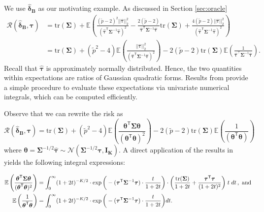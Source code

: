 \documentclass{article}
\newcommand{\bstheta}{\boldsymbol \theta}
\newcommand{\bstau}{\boldsymbol \tau}
\newcommand{\hbstau}{\boldsymbol{\hat \tau}}
\newcommand{\bsSig}{\boldsymbol  \Sigma}
\def\E{\mathbb{E}}
\newcommand{\Tr}{\text{tr}}
\newcommand{\bsdeltb}{\boldsymbol {\hat \delta_B}}
\newcommand{\tran}{\mathsf{T}}
\begin{document}
We use $\bsdeltb$ as our motivating example. As discussed in Section \ref{sec:oracle}
\begin{equation}\label{eq:riskStatement}
\begin{aligned}
\mathcal{R}\left( \bsdeltb, \bstau \right) &= \Tr(\boldsymbol \Sigma) + \E \left( \frac{(\tilde p - 2)^2 ||\hbstau||_2^2}{(\hbstau^\tran \bsSig^{-1} \hbstau)^2}  - 
 \frac{2(\tilde p - 2)}{\hbstau^\tran \bsSig^{-1} \hbstau} \Tr(\bsSig) + \frac{4(\tilde p - 2)|| \hbstau ||_2^2}{(\hbstau^\tran \bsSig^{-1} \hbstau)^2} \right)  \\
&= \Tr(\boldsymbol \Sigma) + (\tilde p^2 - 4) \E \left( \frac{||\hbstau||_2^2}{(\hbstau^\tran \bsSig^{-1} \hbstau)^2} \right) - 2(\tilde p - 2)\Tr(\boldsymbol \Sigma) \E \left( \frac{1 }{\hbstau^\top \bsSig^{-1} \hbstau}  \right)  .
\end{aligned}
\end{equation}
\noindent Recall that $\hbstau$ is approximately normally distributed. Hence, the two quantities within expectations are ratios of Gaussian quadratic forms. Results from \cite{bao2013moments} provide a simple procedure to evaluate these expectations via univariate numerical integrals, which can be computed efficiently. 

Observe that we can rewrite the risk as 
\[ \mathcal{R}\left( \bsdeltb, \bstau \right) = \Tr(\boldsymbol \Sigma) + (\tilde p^2 - 4) \E \left( \frac{\bstheta^\tran \boldsymbol \Sigma \bstheta}{\left( \bstheta^{\tran} \bstheta \right)^2} \right) - 2(\tilde p - 2)\Tr(\bsSig) \E \left( \frac{1 }{\left( \bstheta^{\tran} \bstheta \right)}  \right)  \] 
where $\bstheta = \bsSig^{-1/2} \hbstau \sim \mathcal{N} \left( \bsSig^{-1/2} \bstau, \boldsymbol{I_K} \right)$. %
A direct application of the results in \cite{bao2013moments} yields the following integral expressions: 

\begin{equation}\label{eq:integrals1}
\begin{aligned}
\E\left(  \frac{ \bstheta^{\tran}\bsSig \bstheta}{(\bstheta^{\tran} \bstheta)^2} \right) &= \int_0^{\infty}  ( 1 + 2 t)^{-K/2} \cdot \exp\bigg( - (\bstau^\tran \bsSig^{-1} \bstau) \cdot \frac{t}{1 + 2t} \bigg) \cdot \bigg( \frac{\Tr (\bsSig)}{1 + 2t} + \frac{\bstau^\tran \bstau}{(1 + 2t)^2} \bigg) \hspace{1mm} t \hspace{1mm} dt \,, \mbox{ and} \\
\E\left(  \frac{1}{\bstheta^{\tran} \bstheta} \right) &= \int_0^{\infty}( 1 + 2 t)^{-K/2}  \cdot  \exp\bigg( - (\bstau^\tran \bsSig^{-1} \bstau) \cdot \frac{t}{1 + 2t} \bigg) dt .
\end{aligned}
\end{equation}
\end{document}
